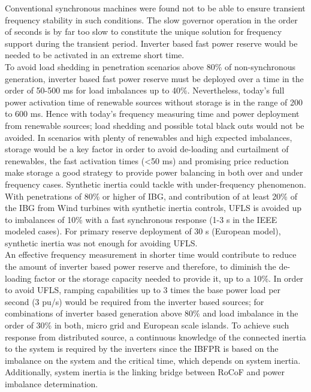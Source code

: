 Conventional synchronous machines were found not to be able to ensure transient frequency stability in such conditions. The slow governor operation in the order of seconds is by far too slow to constitute the unique solution for frequency support during the transient period. Inverter based fast power reserve would be needed to be activated in an extreme short time. \\

To avoid load shedding in penetration scenarios above 80\% of non-synchronous generation, inverter based fast power reserve must be deployed over a time in the order of 50-500 ms for load imbalances up to 40\%. Nevertheless, today’s full power activation time of renewable sources without storage is in the range of 200 to 600 ms. Hence with today’s frequency measuring time and power deployment from renewable sources; load shedding and possible total black outs would not be avoided. In scenarios with plenty of renewables and high expected imbalances, storage would be a key factor in order to avoid de-loading and curtailment of renewables, the fast activation times (<50 ms) and promising price reduction make storage a good strategy to provide power balancing in both over and under frequency cases.
Synthetic inertia could tackle with under-frequency phenomenon. With penetrations of 80\% or higher of IBG, and contribution of at least 20\% of the IBG from Wind turbines with synthetic inertia controls, UFLS is avoided up to imbalances of 10\% with a fast synchronous response (1-3 s in the IEEE modeled cases). For primary reserve deployment of 30 s (European model), synthetic inertia was not enough for avoiding UFLS.\\

An effective frequency measurement in shorter time would contribute to reduce the amount of inverter based power reserve and therefore, to diminish the de-loading factor or the storage capacity needed to provide it, up to a 10\%. In order to avoid UFLS, ramping capabilities up to 3 times the base power load per second (3 pu/s) would be required from the inverter based sources; for combinations of inverter based generation above 80\% and load imbalance in the order of 30\% in both, micro grid and European scale islands. To achieve such response from distributed source, a continuous knowledge of the connected inertia to the system is required by the inverters since the IBFPR is based on the imbalance on the system and the critical time, which depends on system inertia. Additionally, system inertia is the linking bridge between RoCoF and power imbalance determination.
\\

